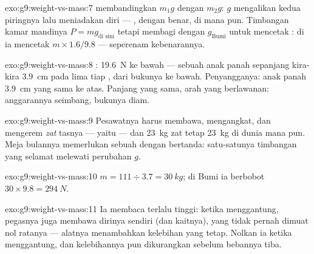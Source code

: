 \begin{solution}{exo:g9:weight-vs-mass:7}
 membandingkan $m_1 g$ dengan $m_2 g$: $g$ mengalikan kedua
piringnya lalu meniadakan diri --- , dengan benar, di mana pun.
Timbangan kamar mandinya  $P = m g_{\text{di sini}}$ tetapi
membagi dengan $g_{\text{Bumi}}$ untuk mencetak : di  ia
mencetak $m \times 1.6/9.8$ --- seperenam kebenarannya.
\end{solution}

\begin{solution}{exo:g9:weight-vs-mass:8}
: \qty{19.6}{N} ke bawah --- sebuah anak panah sepanjang
kira-kira \qty{3.9}{cm} pada lima  tiap , dari bukunya
ke bawah. Penyangganya: anak panah \qty{3.9}{cm} yang sama ke atas.
Panjang yang sama, arah yang berlawanan: anggarannya seimbang,
bukunya diam.
\end{solution}

\begin{solution}{exo:g9:weight-vs-mass:9}
Pesawatnya harus membawa, mengangkat, dan mengerem \emph{zat} tasnya
--- yaitu  --- dan \qty{23}{kg} zat tetap \qty{23}{kg} di dunia
mana pun. Meja bulannya memerlukan sebuah  dengan 
bertanda: satu-satunya timbangan yang selamat melewati perubahan $g$.
\end{solution}

\begin{solution}{exo:g9:weight-vs-mass:10}
$m = 111 \div 3.7 = \qty{30}{kg}$; di Bumi ia berbobot $30
\times 9.8 = \qty{294}{N}$.
\end{solution}

\begin{solution}{exo:g9:weight-vs-mass:11}
Ia membaca terlalu tinggi: ketika menggantung, pegasnya juga membawa
 dirinya sendiri (dan  kaitnya), yang tidak pernah dimuat
nol ratanya --- alatnya menambahkan kelebihan yang tetap. Nolkan ia
ketika menggantung, dan kelebihannya pun dikurangkan sebelum bebannya
tiba.
\end{solution}

